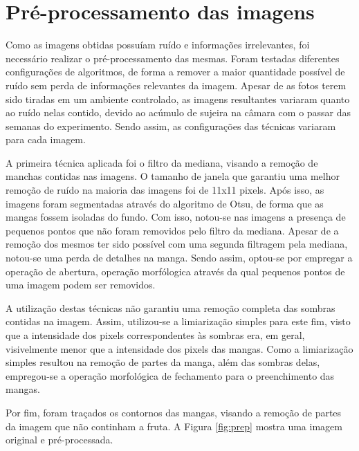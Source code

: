 \section{Pré-processamento das imagens}

Como as imagens obtidas possuíam ruído e informações irrelevantes, foi necessário realizar o pré-processamento das mesmas. Foram testadas diferentes configurações de algoritmos, de forma a remover a maior quantidade possível de ruído sem perda de informações relevantes da imagem. Apesar de as fotos terem sido tiradas em um ambiente controlado, as imagens resultantes variaram quanto ao ruído nelas contido, devido ao acúmulo de sujeira na câmara com o passar das semanas do experimento. Sendo assim, as configurações das técnicas variaram para cada imagem.

A primeira técnica aplicada foi o filtro da mediana, visando a remoção de manchas contidas nas imagens. O tamanho de janela que garantiu uma melhor remoção de ruído na maioria das imagens foi de 11x11 pixels. Após isso, as imagens foram segmentadas através do algoritmo de Otsu, de forma que as mangas fossem isoladas do fundo. Com isso, notou-se nas imagens a presença de pequenos pontos que não foram removidos pelo filtro da mediana. Apesar de a remoção dos mesmos ter sido possível com uma segunda filtragem pela mediana, notou-se uma perda de detalhes na manga. Sendo assim, optou-se por empregar a operação de abertura, operação morfólogica através da qual pequenos pontos de uma imagem podem ser removidos. 

A utilização destas técnicas não garantiu uma remoção completa das sombras contidas na imagem. Assim, utilizou-se a limiarização simples para este fim, visto que a intensidade dos pixels correspondentes às sombras era, em geral, visivelmente menor que a intensidade dos pixels das mangas. Como a limiarização simples resultou na remoção de partes da manga, além das sombras delas, empregou-se a operação morfológica de fechamento para o preenchimento das mangas.

Por fim, foram traçados os contornos das mangas, visando a remoção de partes da imagem que não continham a fruta. A Figura \ref{fig:prep} mostra uma imagem original e pré-processada.

